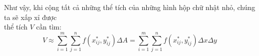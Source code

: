 \documentclass[preview]{standalone}
\begin{document}
\begin{center}
\begin{minipage}{0.7\textwidth}
        Như vậy, khi cộng tất cả những thể tích
        của những hình hộp chữ nhật nhỏ, chúng
        ta sẽ xấp xỉ được \\thể tích $V$ cần tìm:\\
        \centering 
        $$ V \approx \sum_{i=1}^m \sum_{j=1}^n f(x_{ij}^*, y_{ij}^*)\Delta A
        = \sum_{i=1}^m \sum_{j=1}^n f(x_{ij}^*, y_{ij}^*)\Delta x \Delta y $$
        \end{minipage}
\end{center}
\end{document}

